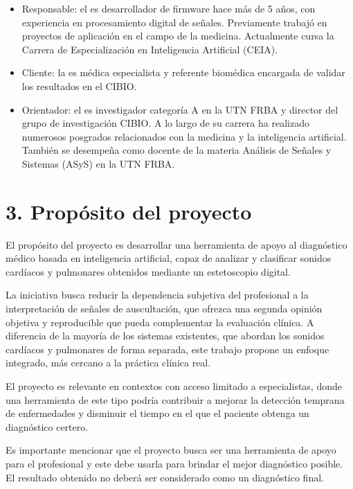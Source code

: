 \documentclass[
11pt, %
]{charter}
\begin{document}
\begin{itemize}
	\item Responsable: el \authorname\hspace{1px} es desarrollador de firmware hace más de 5 años, con experiencia en 
	procesamiento digital de señales. Previamente trabajó en proyectos de aplicación en el campo de la medicina. Actualmente cursa
	la Carrera de Especialización en Inteligencia Artificial (CEIA). 
	\item Cliente: la \clientename\hspace{1px} es médica especialista y referente biomédica encargada de validar los resultados en el CIBIO.
	\item Orientador: el \supname\hspace{1px} es investigador categoría A en la UTN FRBA y director del grupo de investigación CIBIO. A lo largo de
	su carrera ha realizado numerosos posgrados relacionados con la medicina y la inteligencia artificial. También se desempeña
	como docente de la materia Análisis de Señales y Sistemas (ASyS) en la UTN FRBA.
\end{itemize}

\section{3. Propósito del proyecto}
\label{sec:proposito}

El propósito del proyecto es desarrollar una herramienta de apoyo al diagnóstico médico basada en inteligencia artificial, 
capaz de analizar y clasificar sonidos cardíacos y pulmonares obtenidos mediante un estetoscopio digital. 

La iniciativa busca reducir la dependencia subjetiva del profesional a la interpretación de señales de auscultación,
que ofrezca una segunda opinión objetiva y reproducible que pueda complementar la evaluación clínica. A diferencia de la mayoría de 
los sistemas existentes, que abordan los sonidos cardíacos y pulmonares de forma separada, este trabajo propone un enfoque integrado, 
más cercano a la práctica clínica real.

El proyecto es relevante en contextos con acceso limitado a especialistas, donde una herramienta de este tipo podría 
contribuir a mejorar la detección temprana de enfermedades y disminuir el tiempo en el que el paciente obtenga un diagnóstico certero.

Es importante mencionar que el proyecto busca ser una herramienta de apoyo para el profesional y este debe usarla para brindar el 
mejor diagnóstico posible. El resultado obtenido no deberá ser considerado como un diagnóstico final.
\end{document}

